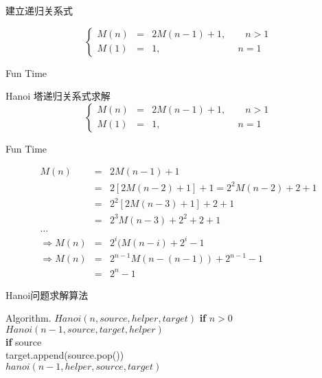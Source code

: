 \documentclass[fontset=fandol,UTF8,fleqn]{beamer}
\begin{document}
\begin{frame}{建立递归关系式}
  \begin{exampleblock}{}
    \begin{displaymath}
  \left \{ \begin{array}{lll}
  M(n) & = & 2M(n-1)+1, \qquad n > 1 \\
M(1) & = & 1, \qquad \qquad \qquad \qquad  n =1
\end{array} \right.
\end{displaymath}
\end{exampleblock}
\end{frame}

\begin{frame}{Fun Time}
  \begin{exampleblock}{ Hanoi 塔递归关系式求解}
    \begin{displaymath}
  \left \{ \begin{array}{lll}
  M(n) & = & 2M(n-1)+1, \qquad n > 1 \\
M(1) & = & 1, \qquad \qquad \qquad \qquad  n =1
\end{array} \right.
\end{displaymath}
\end{exampleblock}
\end{frame}

\begin{frame}{Fun Time}
  \begin{exampleblock}{}
    \begin{eqnarray*}
  M(n) & = & 2M(n-1)+1   \\
& = & 2[2M(n-2)+1]+1 = 2^2M(n-2)+2+1  \\
& = & 2^2[2M(n-3)+1]+2+1   \\
& = & 2^3M(n-3)+2^2+2+1  \\
\ldots   \\
\Rightarrow M(n) & = & 2^i(M(n-i)+2^i-1   \\
\Rightarrow M(n) & = & 2^{n-1}M(n-(n-1))+2^{n-1}-1   \\
& = & 2^n -1   
    \end{eqnarray*}
  \end{exampleblock}
\end{frame}

\begin{frame}{Hanoi问题求解算法}
  \begin{exampleblock}{Algorithm. $Hanoi(n, source, helper, target)$}
\textbf{if} $ n > 0$\\
\qquad $Hanoi(n - 1, source, target, helper)$\\
\qquad \textbf{if} source\\
\qquad \qquad target.append(source.pop())\\
\qquad $ hanoi(n - 1, helper, source, target)$
\end{exampleblock}
\end{frame}
\end{document}
